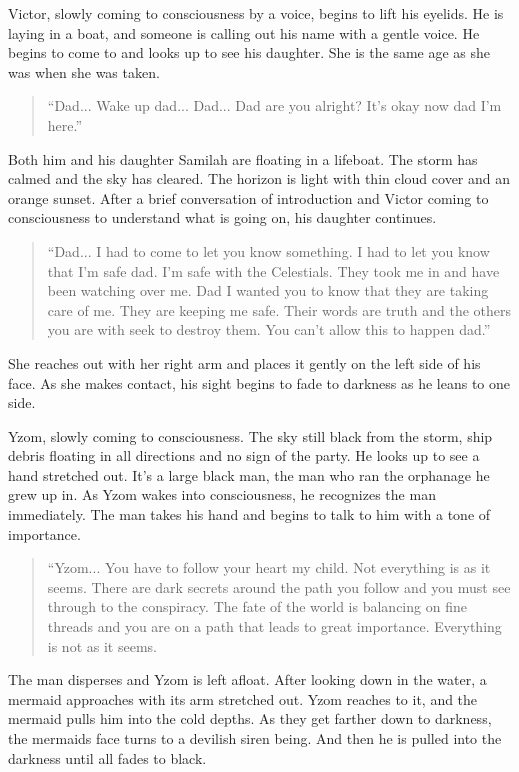 Victor, slowly coming to consciousness by a voice, begins to lift his eyelids. He is laying in a boat, and someone is calling out his name with a gentle voice. He begins to come to and looks up to see his daughter. She is the same age as she was when she was taken.

\begin{quote}
	``Dad... Wake up dad... Dad... Dad are you alright? It's okay now dad I'm here.''
\end{quote}

Both him and his daughter Samilah are floating in a lifeboat. The storm has calmed and the sky has cleared. The horizon is light with thin cloud cover and an orange sunset. After a brief conversation of introduction and Victor coming to consciousness to understand what is going on, his daughter continues.

\begin{quote}
	``Dad... I had to come to let you know something. I had to let you know that I'm safe dad. I'm safe with the Celestials. They took me in and have been watching over me. Dad I wanted you to know that they are taking care of me. They are keeping me safe. Their words are truth and the others you are with seek to destroy them. You can't allow this to happen dad.''
\end{quote}

She reaches out with her right arm and places it gently on the left side of his face. As she makes contact, his sight begins to fade to darkness as he leans to one side.

Yzom, slowly coming to consciousness. The sky still black from the storm, ship debris floating in all directions and no sign of the party. He looks up to see a hand stretched out. It's a large black man, the man who ran the orphanage he grew up in. As Yzom wakes into consciousness, he recognizes the man immediately. The man takes his hand and begins to talk to him with a tone of importance.

\begin{quote}
	``Yzom... You have to follow your heart my child. Not everything is as it seems. There are dark secrets around the path you follow and you must see through to the conspiracy. The fate of the world is balancing on fine threads and you are on a path that leads to great importance. Everything is not as it seems.
\end{quote}

The man disperses and Yzom is left afloat. After looking down in the water, a mermaid approaches with its arm stretched out. Yzom reaches to it, and the mermaid pulls him into the cold depths. As they get farther down to darkness, the mermaids face turns to a devilish siren being. And then he is pulled into the darkness until all fades to black.

